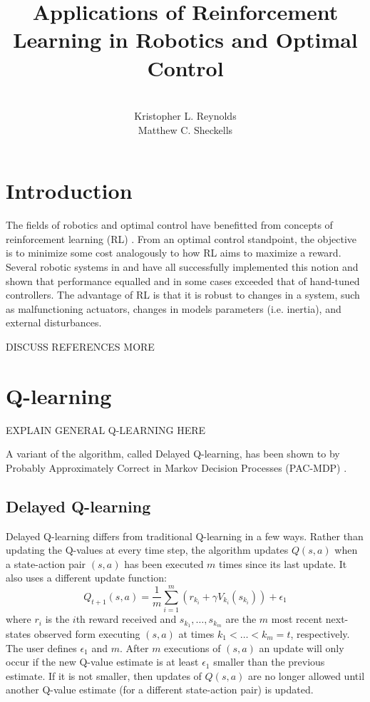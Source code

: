 \documentclass[10pt]{article}
\begin{document}
\title{Applications of Reinforcement Learning in Robotics and Optimal Control}%
\author{\\ %
Kristopher L. Reynolds\\
Matthew C. Sheckells
\\} %
\maketitle
\section{Introduction}
The fields of robotics and optimal control have benefitted from concepts of reinforcement learning (RL) \cite{kober_reinforcement_2013} \cite{kaelbling_reinforcement_1996}. From an optimal control standpoint, the objective is to minimize some cost analogously to how RL aims to maximize a reward.  Several robotic systems in  \cite{bhasin_reinforcement_2011} and \cite{hester_rtmba:_2012} have all successfully implemented this notion and shown that performance equalled and in some cases exceeded that of hand-tuned controllers. The advantage of RL is that it is robust to changes in a system, such as malfunctioning actuators, changes in models parameters (i.e. inertia), and external disturbances. 

DISCUSS REFERENCES MORE

\section{Q-learning}
EXPLAIN GENERAL Q-LEARNING HERE

A variant of the algorithm, called Delayed Q-learning, has been shown to by Probably Approximately Correct in Markov Decision Processes (PAC-MDP) \cite{strehl_pac_2006}.

\subsection{Delayed Q-learning}
Delayed Q-learning differs from traditional Q-learning in a few ways.  Rather than updating the Q-values at every time step, the algorithm updates $Q(s,a)$ when a state-action pair $(s,a)$ has been executed $m$ times since its last update.  It also uses a different update function:
$$Q_{t+1}(s,a) = \frac{1}{m}\sum_{i=1}^m(r_{k_i}+\gamma V_{k_i}(s_{k_i})) + \epsilon_1$$  
where $r_i$ is the $i$th reward received and $s_{k_1},\dots,s_{k_m}$ are the $m$ most recent next-states observed form executing $(s,a)$ at times $k_1 < \dots < k_m = t$, respectively. The user defines $\epsilon_1$ and $m$.   
After $m$ executions of $(s,a)$ an update will only occur if the new Q-value estimate is at least $\epsilon_1$ smaller than the previous estimate.  If it is not smaller, then updates of $Q(s,a)$ are no longer allowed until another Q-value estimate (for a different state-action pair) is updated.
\end{document}
